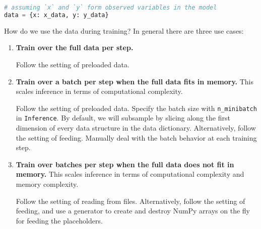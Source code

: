 \begin{lstlisting}[language=Python]
# assuming `x` and `y` form observed variables in the model
data = {x: x_data, y: y_data}
\end{lstlisting}


How do we use the data during training? In general there are three use
cases:

\begin{enumerate}
\item
\textbf{Train over the full data per step.}

Follow the setting of preloaded data.
\item
\textbf{Train over a batch per step when the full data fits in memory.} This
scales inference in terms of computational complexity.

Follow the setting of preloaded data. Specify the batch size with
\texttt{n_minibatch} in \texttt{Inference}. By default, we will subsample by
slicing along the first dimension of every data structure in the
data dictionary. Alternatively, follow the setting of feeding.
Manually deal with the batch behavior at each training step.
\item
\textbf{Train over batches per step when the full data does not fit in
memory.} This scales inference in terms of computational complexity and
memory complexity.

Follow the setting of reading from files. Alternatively, follow the
setting of feeding, and use a generator to create and destroy NumPy
arrays on the fly for feeding the placeholders.
\end{enumerate}
